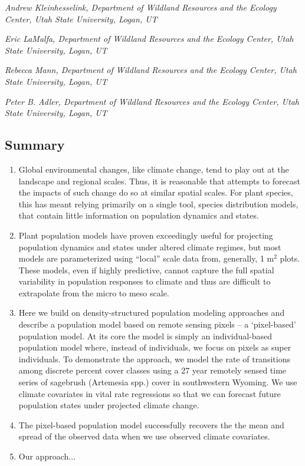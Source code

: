 \documentclass[12pt,]{article}
\begin{document}
\emph{Andrew Kleinhesselink, Department of Wildland Resources and the
Ecology Center, Utah State University, Logan, UT}

\emph{Eric LaMalfa, Department of Wildland Resources and the Ecology
Center, Utah State University, Logan, UT}

\emph{Rebecca Mann, Department of Wildland Resources and the Ecology
Center, Utah State University, Logan, UT}

\emph{Peter B. Adler, Department of Wildland Resources and the Ecology
Center, Utah State University, Logan, UT}

\subsection{Summary}\label{summary}

\begin{enumerate}
\item Global environmental changes, like climate change, tend to play out at the landscape and regional scales. Thus, it is reasonable that attempts to forecast the impacts of such change do so at similar spatial scales. For plant species, this has meant relying primarily on a single tool, species distribution models, that contain little information on population dynamics and states.

\item Plant population models have proven exceedingly useful for projecting population dynamics and states under altered climate regimes, but most models are parameterized using “local” scale data from, generally, 1 $\text{m}^{2}$ plots. These models, even if highly predictive, cannot capture the full spatial variability in population responses to climate and thus are difficult to extrapolate from the micro to meso scale.

\item Here we build on density-structured population modeling approaches and describe a population model based on remote sensing pixels -- a `pixel-based' population model. At its core the model is simply an individual-based population model where, instead of individuals, we focus on pixels as super individuals. To demonstrate the approach, we model the rate of transitions among discrete percent cover classes using a 27 year remotely sensed time series of sagebrush (Artemesia spp.) cover in southwestern Wyoming. We use climate covariates in vital rate regressions so that we can forecast future population states under projected climate change.

\item The pixel-based population model successfully recovers the the mean and spread of the observed data when we use observed climate covariates. 

\item Our approach...
\end{enumerate}
\end{document}
